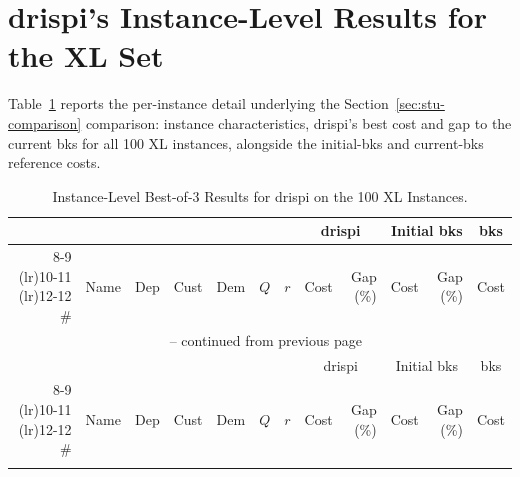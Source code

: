 \section[DRISPI's Instance-Level Results for the XL Set]{\texorpdfstring{\gls{drispi}}{DRISPI}'s Instance-Level Results for the XL Set}\label{app:xl-results}
Table~\ref{tab:xl-summary} reports the per-instance detail underlying the Section~\ref{sec:stu-comparison} comparison: instance characteristics, \gls{drispi}'s best cost and gap to the current \gls{bks} for all 100 XL instances, alongside the initial-\gls{bks} and current-\gls{bks} reference costs.

\begin{scriptsize}
\setlength{\tabcolsep}{3pt}
\begin{longtable}{@{}rlcllrrrrrrr@{}}
\caption{Instance-Level Best-of-3 Results for \gls{drispi} on the 100 XL Instances.}\label{tab:xl-summary}\\
\toprule
& & & & & & & \multicolumn{2}{c}{\gls{drispi}} & \multicolumn{2}{c}{Initial \gls{bks}} & \multicolumn{1}{c}{\gls{bks}} \\
\cmidrule(lr){8-9} \cmidrule(lr){10-11} \cmidrule(lr){12-12}
\# & Name & Dep & Cust & Dem & $Q$ & $r$ & \multicolumn{1}{c}{Cost} & Gap (\%) & \multicolumn{1}{c}{Cost} & Gap (\%) & \multicolumn{1}{c}{Cost} \\
\midrule
\endfirsthead
\multicolumn{12}{c}{\tablename\ \thetable{} -- continued from previous page}\\
\toprule
& & & & & & & \multicolumn{2}{c}{\gls{drispi}} & \multicolumn{2}{c}{Initial \gls{bks}} & \multicolumn{1}{c}{\gls{bks}} \\
\cmidrule(lr){8-9} \cmidrule(lr){10-11} \cmidrule(lr){12-12}
\# & Name & Dep & Cust & Dem & $Q$ & $r$ & \multicolumn{1}{c}{Cost} & Gap (\%) & \multicolumn{1}{c}{Cost} & Gap (\%) & \multicolumn{1}{c}{Cost} \\
\midrule
\endhead
\bottomrule
\endfoot
\bottomrule
\endlastfoot

\end{longtable}
\end{scriptsize}
